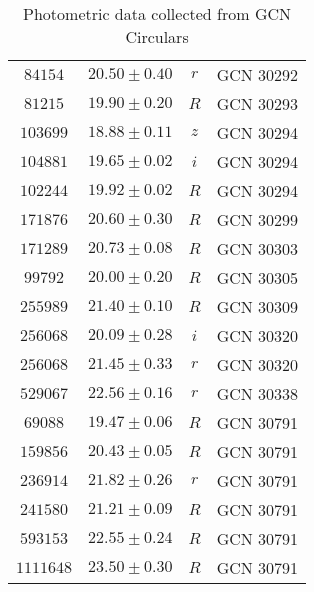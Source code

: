\documentclass{naturesubmissionstyle}
\begin{document}
\begin{table}
\begin{tabular}{cccc}
$84154$ & $20.50\pm0.40$ & $r$ & GCN 30292\cite{gcn_30292} \\
$81215$ & $19.90\pm0.20$ & $R$ & GCN 30293\cite{gcn_30293} \\
$103699$ & $18.88\pm0.11$ & $z$ & GCN 30294\cite{gcn_30294} \\
$104881$ & $19.65\pm0.02$ & $i$ & GCN 30294\cite{gcn_30294} \\
$102244$ & $19.92\pm0.02$ & $R$ & GCN 30294\cite{gcn_30294} \\
$171876$ & $20.60\pm0.30$ & $R$ & GCN 30299\cite{gcn_30299} \\
$171289$ & $20.73\pm0.08$ & $R$ & GCN 30303\cite{gcn_30303} \\
$99792$ & $20.00\pm0.20$ & $R$ & GCN 30305\cite{gcn_30305} \\
$255989$ & $21.40\pm0.10$ & $R$ & GCN 30309\cite{gcn_30309} \\
$256068$ & $20.09\pm0.28$ & $i$ & GCN 30320\cite{gcn_30320} \\
$256068$ & $21.45\pm0.33$ & $r$ & GCN 30320\cite{gcn_30320} \\
$529067$ & $22.56\pm0.16$ & $r$ & GCN 30338\cite{gcn_30338} \\
$69088$ & $19.47\pm0.06$ & $R$ & GCN 30791\cite{gcn_30791} \\
$159856$ & $20.43\pm0.05$ & $R$ & GCN 30791\cite{gcn_30791} \\
$236914$ & $21.82\pm0.26$ & $r$ & GCN 30791\cite{gcn_30791} \\
$241580$ & $21.21\pm0.09$ & $R$ & GCN 30791\cite{gcn_30791} \\
$593153$ & $22.55\pm0.24$ & $R$ & GCN 30791\cite{gcn_30791} \\
$1111648$ & $23.50\pm0.30$ & $R$ & GCN 30791\cite{gcn_30791} \\
\hline	

\end{tabular}
\caption{Photometric data collected from GCN Circulars}
\label{table:gcns}
\end{table}

\newpage 
\end{document}

